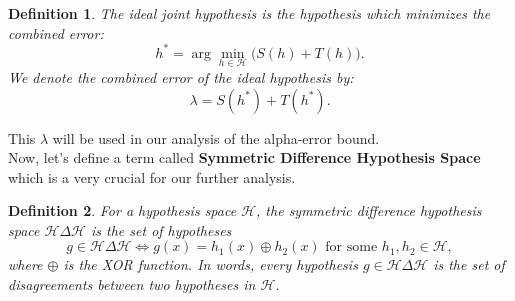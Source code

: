 \documentclass{article}
\newtheorem{definition}{Definition}
\begin{document}
\begin{definition}
The ideal joint hypothesis is the hypothesis which minimizes the combined error:
\[
h^* = \arg\min_{h \in \mathcal{H}} \big(S(h) + T(h)\big).
\]
We denote the combined error of the ideal hypothesis by:
\[
\lambda = S(h^*) + T(h^*).
\]
\end{definition}
This $\lambda$ will be used in our analysis of the alpha-error bound.\\
Now, let's define a term called \textbf{Symmetric Difference Hypothesis Space} which is a very crucial for our further analysis.\\
\begin{definition}
For a hypothesis space $\mathcal{H}$, the symmetric difference hypothesis space $\mathcal{H} \Delta \mathcal{H}$ is
the set of hypotheses
\[
g \in \mathcal{H} \Delta \mathcal{H} \iff g(x) = h_1(x) \oplus h_2(x) \text{ for some } h_1, h_2 \in \mathcal{H},
\]
where $\oplus$ is the XOR function. In words, every hypothesis $g \in \mathcal{H} \Delta \mathcal{H}$ is the set of disagreements
between two hypotheses in $\mathcal{H}$.
\end{definition}
\end{document}

